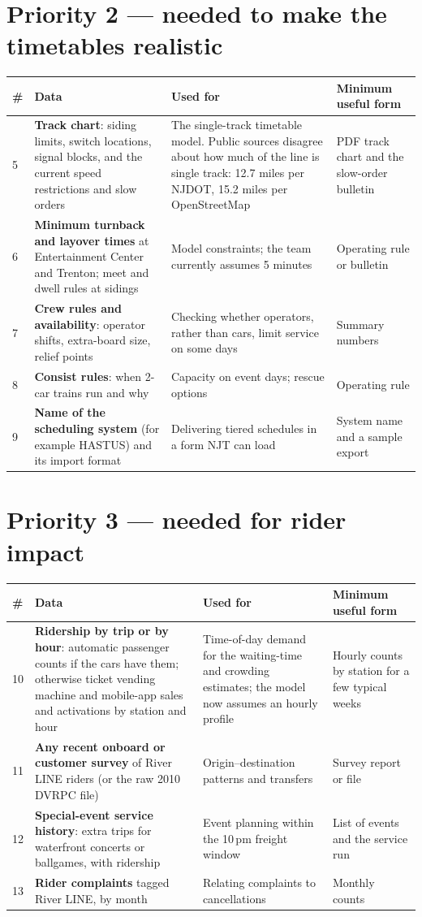 \documentclass[11pt]{article}
\begin{document}
\section*{Priority 2 --- needed to make the timetables realistic}
\begin{longtable}{@{}p{0.5cm}p{5.3cm}p{5.2cm}p{3.6cm}@{}}
\toprule
\# & Data & Used for & Minimum useful form \\
\midrule\endhead
5 & \textbf{Track chart}: siding limits, switch locations, signal blocks, and the current speed restrictions and slow orders & The single-track timetable model. Public sources disagree about how much of the line is single track: 12.7 miles per NJDOT, 15.2 miles per OpenStreetMap & PDF track chart and the slow-order bulletin \\
6 & \textbf{Minimum turnback and layover times} at Entertainment Center and Trenton; meet and dwell rules at sidings & Model constraints; the team currently assumes 5 minutes & Operating rule or bulletin \\
7 & \textbf{Crew rules and availability}: operator shifts, extra-board size, relief points & Checking whether operators, rather than cars, limit service on some days & Summary numbers \\
8 & \textbf{Consist rules}: when 2-car trains run and why & Capacity on event days; rescue options & Operating rule \\
9 & \textbf{Name of the scheduling system} (for example HASTUS) and its import format & Delivering tiered schedules in a form NJT can load & System name and a sample export \\
\bottomrule
\end{longtable}

\section*{Priority 3 --- needed for rider impact}
\begin{longtable}{@{}p{0.5cm}p{5.3cm}p{5.2cm}p{3.6cm}@{}}
\toprule
\# & Data & Used for & Minimum useful form \\
\midrule\endhead
10 & \textbf{Ridership by trip or by hour}: automatic passenger counts if the cars have them; otherwise ticket vending machine and mobile-app sales and activations by station and hour & Time-of-day demand for the waiting-time and crowding estimates; the model now assumes an hourly profile & Hourly counts by station for a few typical weeks \\
11 & \textbf{Any recent onboard or customer survey} of River LINE riders (or the raw 2010 DVRPC file) & Origin--destination patterns and transfers & Survey report or file \\
12 & \textbf{Special-event service history}: extra trips for waterfront concerts or ballgames, with ridership & Event planning within the 10\,pm freight window & List of events and the service run \\
13 & \textbf{Rider complaints} tagged River LINE, by month & Relating complaints to cancellations & Monthly counts \\
\bottomrule
\end{longtable}
\end{document}
